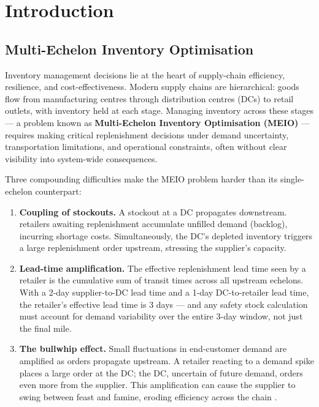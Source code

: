 \chapter{Introduction}
\label{chap:intro}

\section{Multi-Echelon Inventory Optimisation}
\label{sec:intro:problem}

Inventory management decisions lie at the heart of supply-chain efficiency,
resilience, and cost-effectiveness.  Modern supply chains are hierarchical:
goods flow from manufacturing centres through distribution centres (DCs)
to retail outlets, with inventory held at each stage.  Managing inventory
across these stages — a problem known as \textbf{Multi-Echelon Inventory
Optimisation (MEIO)} — requires making critical replenishment decisions
under demand uncertainty, transportation limitations, and operational
constraints, often without clear visibility into system-wide consequences.

Three compounding difficulties make the MEIO problem harder than its
single-echelon counterpart:

\begin{enumerate}
  \item \textbf{Coupling of stockouts.}  A stockout at a DC propagates
        downstream. retailers awaiting replenishment accumulate unfilled
        demand (backlog), incurring shortage costs.  Simultaneously, the
        DC's depleted inventory triggers a large replenishment order
        upstream, stressing the supplier's capacity.

  \item \textbf{Lead-time amplification.}  The effective replenishment
        lead time seen by a retailer is the cumulative sum of transit
        times across all upstream echelons.  With a 2-day
        supplier-to-DC lead time and a 1-day DC-to-retailer lead time,
        the retailer's effective lead time is 3 days — and any safety
        stock calculation must account for demand variability over the
        entire 3-day window, not just the final mile.

  \item \textbf{The bullwhip effect.}  Small fluctuations in
        end-customer demand are amplified as orders propagate upstream.
        A retailer reacting to a demand spike places a large order at
        the DC; the DC, uncertain of future demand, orders even more from
        the supplier.  This amplification can cause the supplier to
        swing between feast and famine, eroding efficiency across the
        chain \citep{LeeEtAl1997}.
\end{enumerate}

